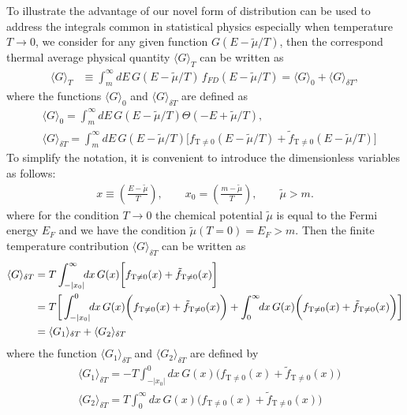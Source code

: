 \documentclass[sn-mathphys,Numbered]{sn-jnl}
\begin{document}
To illustrate the advantage of our novel form of distribution can be used to address the integrals common in statistical physics especially when temperature $T\to0$, we consider for any given function $G(E-\tilde\mu/T)$, then the correspond  thermal average physical quantity $\langle G\rangle_T$ can be written as
\begin{align}
\langle G\rangle_T&\equiv\int^{\infty}_{m}\!\!dE\,G(E-\tilde\mu/T)\,f_{FD}(E-\tilde\mu/T)=\langle G\rangle_{0}+\langle G\rangle_{\delta T},
\end{align}
where the functions $\langle G\rangle_{0}$ and $\langle G\rangle_{\delta T}$ are defined as
\begin{align}
&\langle G\rangle_{0}=\int^{\infty}_{m}\!\!dE\,G(E-\tilde\mu/T)\Theta(-E+\tilde\mu/T),\\
&\langle G\rangle_{\delta T}=\int^{\infty}_{m}\!\!dE\,G(E-\tilde\mu/T)\bigg[f_\mathrm{T\neq0}(E-\tilde\mu/T)+\tilde f_\mathrm{T\neq0}(E-\tilde\mu/T)\bigg]
\end{align}
To simplify the notation, it is convenient to introduce the dimensionless variables as follows:
\begin{align}
x\equiv\left(\frac{E-\tilde\mu}{T}\right), \qquad x_0=\left(\frac{m-\tilde\mu}{T}\right),\qquad \tilde\mu>m.
\end{align}
where for the condition $T\to0$ the chemical potential $\tilde\mu$ is equal to the Fermi energy $E_F$ and we have the condition $\tilde\mu(T=0)= E_F>m$. Then the finite temperature contribution $\langle G\rangle_{\delta T}$ can be written as
\begin{align}\label{G_deltaT}
\langle G\rangle_{\delta T}&=T\int_{-|x_0|}^\infty \!\!dx\,G(x)\bigg[f_\mathrm{T\neq0}(x)+\tilde f_\mathrm{T\neq0}(x)\bigg]\notag\\
&=T\bigg[\int_{-|x_0|}^{0}\!\!dx\,G(x)\bigg(f_\mathrm{T\neq0}(x)+\tilde f_\mathrm{T\neq0}(x)\bigg)+\int_{0}^{\infty}\!\!dx\,G(x)\bigg(f_\mathrm{T\neq0}(x)+\tilde f_\mathrm{T\neq0}(x)\bigg)\bigg]\notag
\\&=\langle G_1\rangle_{\delta T}+\langle G_2\rangle_{\delta T}
\end{align}
where the function $\langle G_1\rangle_{\delta T}$ and $\langle G_2\rangle_{\delta T}$ are defined by
\begin{align}
&\langle G_1\rangle_{\delta T}=-T\int_{-|x_0|}^{0}\!\!dx\,G(x)\bigg(f_\mathrm{T\neq0}(x)+\tilde f_\mathrm{T\neq0}(x)\bigg)\\
&\langle G_2\rangle_{\delta T}=T\int_{0}^{\infty}\!\!dx\,G(x)\bigg(f_\mathrm{T\neq0}(x)+\tilde f_\mathrm{T\neq0}(x)\bigg)
\end{align}
\end{document}
